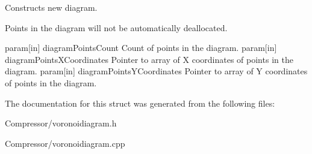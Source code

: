 Constructs new diagram. 

Points in the diagram will not be automatically deallocated.

param\mbox{[}in\mbox{]} diagram\+Points\+Count Count of points in the diagram. param\mbox{[}in\mbox{]} diagram\+Points\+X\+Coordinates Pointer to array of X coordinates of points in the diagram. param\mbox{[}in\mbox{]} diagram\+Points\+Y\+Coordinates Pointer to array of Y coordinates of points in the diagram. 

The documentation for this struct was generated from the following files\+:\begin{DoxyCompactItemize}
\item 
Compressor/voronoidiagram.\+h\item 
Compressor/voronoidiagram.\+cpp\end{DoxyCompactItemize}
